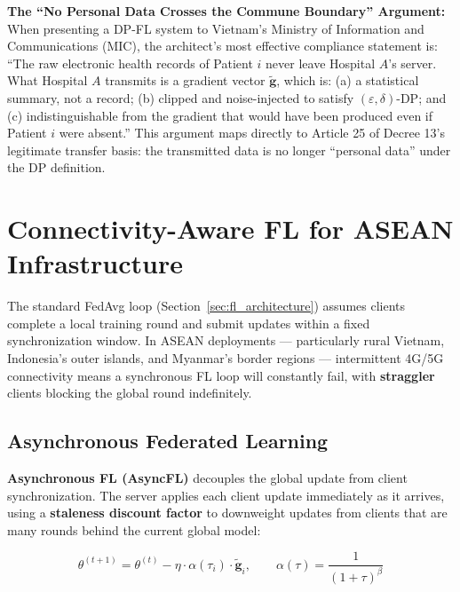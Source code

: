 \begin{svgraybox}
\textbf{The ``No Personal Data Crosses the Commune Boundary'' Argument:} When presenting a DP-FL system to Vietnam's Ministry of Information and Communications (MIC), the architect's most effective compliance statement is: ``The raw electronic health records of Patient $i$ never leave Hospital $A$'s server. What Hospital $A$ transmits is a gradient vector $\tilde{\mathbf{g}}$, which is: (a) a statistical summary, not a record; (b) clipped and noise-injected to satisfy $(\varepsilon, \delta)$-DP; and (c) indistinguishable from the gradient that would have been produced even if Patient $i$ were absent.'' This argument maps directly to Article 25 of Decree 13's legitimate transfer basis: the transmitted data is no longer ``personal data'' under the DP definition.
\end{svgraybox}

\section{Connectivity-Aware FL for ASEAN Infrastructure}
\label{sec:fl_asean_connectivity}

The standard FedAvg loop (Section~\ref{sec:fl_architecture}) assumes clients complete a local training round and submit updates within a fixed synchronization window. In ASEAN deployments --- particularly rural Vietnam, Indonesia's outer islands, and Myanmar's border regions --- intermittent 4G/5G connectivity means a synchronous FL loop will constantly fail, with \textbf{straggler} clients blocking the global round indefinitely.

\subsection{Asynchronous Federated Learning}
\label{subsec:async_fl}

\textbf{Asynchronous FL (AsyncFL)} decouples the global update from client synchronization. The server applies each client update immediately as it arrives, using a \textbf{staleness discount factor} to downweight updates from clients that are many rounds behind the current global model:

\begin{equation}
  \theta^{(t+1)} = \theta^{(t)} - \eta \cdot \alpha(\tau_i) \cdot \tilde{\mathbf{g}}_i,
  \qquad \alpha(\tau) = \frac{1}{(1 + \tau)^{\beta}}
  \label{eq:async_fl}
\end{equation}

